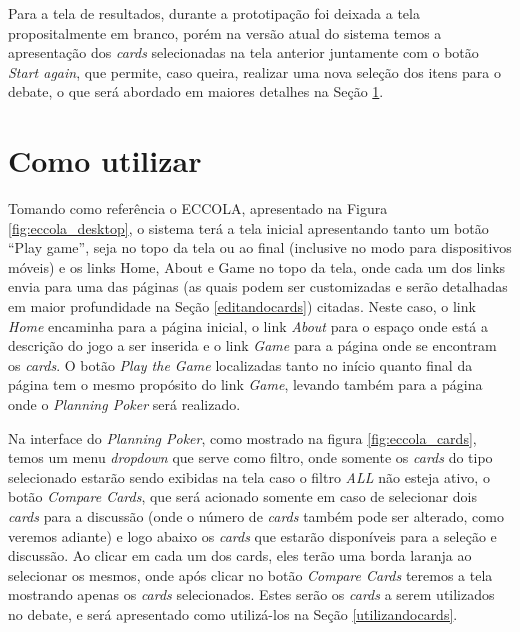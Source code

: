 Para a tela de resultados, durante a prototipação foi deixada a tela propositalmente em branco, porém na versão atual do sistema temos a apresentação dos \textit{cards} selecionadas na tela anterior juntamente com o botão \textit{Start again}, que permite, caso queira, realizar uma nova seleção dos itens para o debate, o que será abordado em maiores detalhes na Seção \ref{Como utilizar}.

\section{Como utilizar}
\label{Como utilizar}

Tomando como referência o ECCOLA, apresentado na Figura \ref{fig:eccola_desktop}, o sistema terá a tela inicial apresentando tanto um botão ``Play game'', seja no topo da tela ou ao final (inclusive no modo para dispositivos móveis) e os links Home, About e Game no topo da tela, onde cada um dos links envia para uma das páginas (as quais podem ser customizadas e serão detalhadas em maior profundidade na Seção \ref{editandocards}) citadas. Neste caso, o link \textit{Home} encaminha para a página inicial, o link \textit{About} para o espaço onde está a descrição do jogo a ser inserida e o link \textit{Game} para a página onde se encontram os \textit{cards}. O botão \textit{Play the Game} localizadas tanto no início quanto final da página  tem o mesmo propósito do link \textit{Game}, levando também para a página onde o \textit{Planning Poker} será realizado.

Na interface do \textit{Planning Poker}, como mostrado na figura \ref{fig:eccola_cards}, temos um menu \textit{dropdown} que serve como filtro, onde somente os \textit{cards} do tipo selecionado estarão sendo exibidas na tela caso o filtro \textit{ALL} não esteja ativo, o botão \textit{Compare Cards}, que será acionado somente em caso de selecionar dois \textit{cards} para a discussão (onde o número de \textit{cards} também pode ser alterado, como veremos adiante) e logo abaixo os \textit{cards} que estarão disponíveis para a seleção e discussão. Ao clicar em cada um dos cards, eles terão uma borda laranja ao selecionar os mesmos, onde após clicar no botão \textit{Compare Cards} teremos a tela mostrando apenas os \textit{cards} selecionados. Estes serão os \textit{cards} a serem utilizados no debate, e será apresentado como utilizá-los na Seção \ref{utilizandocards}.

